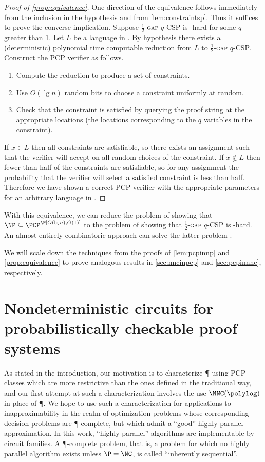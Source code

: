 \documentclass[]{article}
\begin{document}
\begin{proof}[Proof of \autoref{prop:equivalence}]
  One direction of the equivalence follows immediately from the inclusion in the hypothesis and from \autoref{lem:constraintsp}.
  Thus it suffices to prove the converse implication.
  Suppose \textsc{$\frac{1}{2}$-gap $q$-CSP} is \NP-hard for some $q$ greater than 1.
  Let $L$ be a language in \NP.
  By hypothesis there exists a (deterministic) polynomial time computable reduction from $L$ to \textsc{$\frac{1}{2}$-gap $q$-CSP}.
  Construct the PCP verifier as follows.
  \begin{enumerate}
  \item Compute the reduction to produce a set of constraints.
  \item Use $O(\lg n)$ random bits to choose a constraint uniformly at random.
  \item Check that the constraint is satisfied by querying the proof string at the appropriate locations (the locations corresponding to the $q$ variables in the constraint).
  \end{enumerate}

  If $x \in L$ then all constraints are satisfiable, so there exists an assignment such that the verifier will accept on all random choices of the constraint.
  If $x \notin L$ then fewer than half of the constraints are satisfiable, so for any assignment the probability that the verifier will select a satisfied constraint is less than half.
  Therefore we have shown a correct PCP verifier with the appropriate parameters for an arbitrary language in \NP.
\end{proof}
With this equivalence, we can reduce the problem of showing that $\NP \subseteq \PCP^\P[O(\lg n), O(1)]$ to the problem of showing that \textsc{$\frac{1}{2}$-gap $q$-CSP} is \NP-hard.
An almost entirely combinatoric approach can solve the latter problem \cite{dinur07}.

We will scale down the techniques from the proofs of \autoref{lem:pcpinnp} and \autoref{prop:equivalence} to prove analogous results in \autoref{sec:nncinpcp} and \autoref{sec:pcpinnnc}, respectively.

\section{Nondeterministic \texorpdfstring{\NC}{NC} circuits for probabilistically checkable proof systems}\label{sec:nncinpcp}

As stated in the introduction, our motivation is to characterize \P{} using PCP classes which are more restrictive than the ones defined in the traditional way, and our first attempt at such a characterization involves the use $\NNC(\polylog)$ in place of \P.
We hope to use such a characterization for applications to inapproximability in the realm of optimization problems whose corresponding decision problems are \P-complete, but which admit a ``good'' highly parallel approximation.
In this work, ``highly parallel'' algorithms are implementable by \NC{} circuit families.
A \P-complete problem, that is, a problem for which no highly parallel algorithm exists unless $\P = \NC$, is called ``inherently sequential''.
\end{document}
